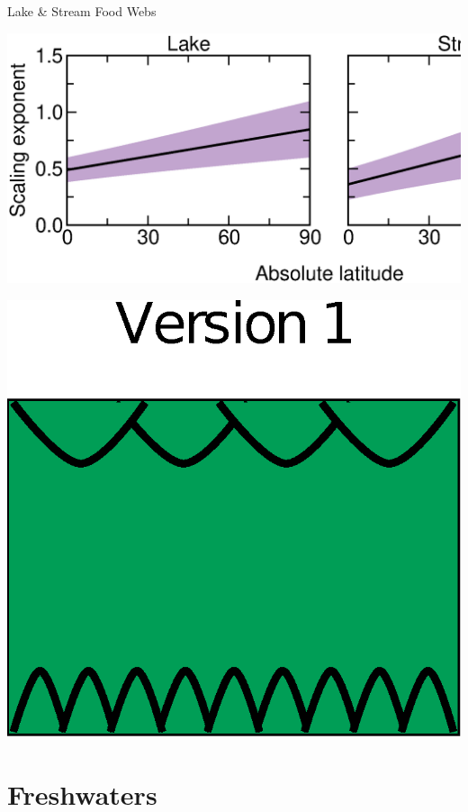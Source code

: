 \documentclass{beamer}
\begin{document}
  \begin{frame}{Lake \& Stream Food Webs}
    \begin{center}
      \includegraphics*[width=.75\textwidth]{Figures/results/effect.eps}

    \vspace{1.02cm}

    \includegraphics*[width=.255\textwidth]{Figures/version1.eps}

    \end{center}
  \end{frame}


\section*{Freshwaters}


      
\end{document}

